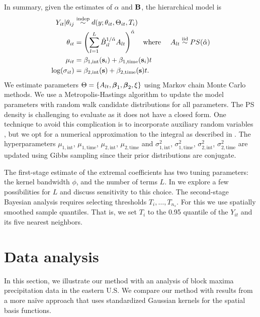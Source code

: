\documentclass[aoas]{imsart}
\begin{document}
In summary, given the estimates of $\alpha$ and $\mathbf{B}$, the hierarchical model is
\begin{align} \label{ebeq:bayesmodel}
  Y_{it} |\theta_{ij} &\indep d(y;\theta_{it},\Theta_{it}, T_i) \\
  \theta_{it} &= \left(\sum_{l=1}^L{\hat B}_{il}^{1/\alphahat}A_{lt}\right)^{\alphahat}
  \text{\ \ \ where \ \ \ }
  A_{lt} \iid PS(\alphahat)\nonumber\\
  \mu_{it} &= \beta_{1, \text{int}}(\bs_i) + \beta_{1, \text{time}}(\bs_i) t \nonumber \\
  \log(\sigma_{it}) &= \beta_{2, \text{int}}(\bs) + \beta_{2, \text{time}}(\bs) t. \nonumber
\end{align}
We estimate parameters $\Theta = \left\{A_{lt}, \mbox{\boldmath $\beta$}_1, \mbox{\boldmath $\beta$}_2, \xi \right\}$ using Markov chain Monte Carlo methods.
We use a Metropolis-Hastings algorithm to update the model parameters with random walk candidate distributions for all parameters.
The PS density is challenging to evaluate as it does not have a closed form.
One technique to avoid this complication is to incorporate auxiliary random variables \citep{Stephenson2009}, but we opt for a numerical approximation to the integral as described in .
The hyperparameters $\mu_{1, \text{int}}$, $\mu_{1, \text{time}}$, $\mu_{2, \text{int}}$, $\mu_{2, \text{time}}$ and $\sigma^2_{1, \text{int}}$, $\sigma^2_{1, \text{time}}$, $\sigma^2_{2, \text{int}}$, $\sigma^2_{2, \text{time}}$ are updated using Gibbs sampling since their prior distributions are conjugate.

The first-stage estimate of the extremal coefficients has two tuning parameters: the kernel bandwidth $\phi$, and the number of terms $L$.
In  we explore a few possibilities for $L$ and discuss sensitivity to this choice.
The second-stage Bayesian analysis requires selecting thresholds $T_i,\ldots,T_{n_s}$.  For this we use spatially smoothed sample quantiles.
That is, we set $T_i$ to the 0.95 quantile of the $Y_{it}$ and its five nearest neighbors.

\section{Data analysis}\label{ebs:analysis}

In this section, we illustrate our method with an analysis of block maxima precipitation data in the eastern U.S.
We compare our method with results from a more na\"{i}ve approach that uses standardized Gaussian kernels for the spatial basis functions.
\end{document}
